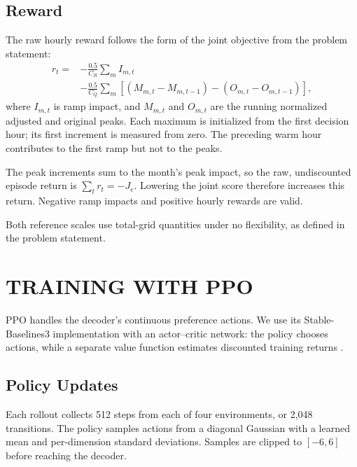 \documentclass{UNCC-thesis}
\begin{document}
\section{Reward}
\label{subsec:reward}

The raw hourly reward follows the form of the joint objective from the
problem statement:
\begin{equation}
  \begin{aligned}
    r_t
    ={}&-\frac{0.5}{C_R}\sum_m I_{m,t}\\
    &-\frac{0.5}{C_Q}\sum_m\left[
      \left(M_{m,t}-M_{m,t-1}\right)
      -\left(O_{m,t}-O_{m,t-1}\right)
    \right],
  \end{aligned}
  \label{eq:reward}
\end{equation}
where \(I_{m,t}\) is ramp impact, and \(M_{m,t}\) and \(O_{m,t}\) are the
running normalized adjusted and original peaks. Each maximum is initialized
from the first decision hour; its first increment is measured from zero.
The preceding warm hour contributes to the first ramp but not to the peaks.

The peak increments sum to the month's peak impact, so the raw,
undiscounted episode return is \(\sum_t r_t=-J_e\). Lowering the joint score
therefore increases this return. Negative ramp impacts and positive hourly
rewards are valid.

Both reference scales use total-grid quantities under no flexibility,
as defined in the problem statement.

\chapter{TRAINING WITH PPO}
\label{sec:ppo}

PPO handles the decoder's continuous preference actions. We use its
Stable-Baselines3 implementation \cite{schulman2017ppo,raffin2021sb3} with an
actor--critic network: the policy chooses actions, while a separate value
function estimates discounted training returns
\cite{sutton2018reinforcement}.

\section{Policy Updates}

Each rollout collects 512 steps from each of four environments, or 2,048
transitions. The policy samples actions from a diagonal Gaussian with a
learned mean and per-dimension standard deviations. Samples are clipped to
\([-6,6]\) before reaching the decoder.
\end{document}
